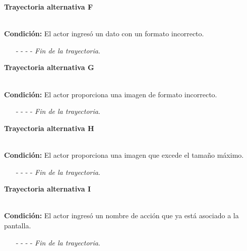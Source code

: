 \hypertarget{CU11-1-1-2:TAF}{\textbf{Trayectoria alternativa F}}\\
\noindent \textbf{Condición:} El actor ingresó un dato con un formato incorrecto.
\begin{enumerate}
	\UCpaso[\UCsist] Muestra el mensaje  señalando el campo que presenta el error en la pantalla .
	\UCpaso Regresa al paso \ref{CU11.1.2-P4} de la trayectoria principal.
	\item[- -] - - {\em {Fin de la trayectoria}}.
\end{enumerate}
\hypertarget{CU11-1-1-2:TAG}{\textbf{Trayectoria alternativa G}}\\
\noindent \textbf{Condición:} El actor proporciona una imagen de formato incorrecto.
\begin{enumerate}
	\UCpaso[\UCsist] Muestra el mensaje  señalando el campo que presenta el error en la pantalla .
	\UCpaso Regresa al paso \ref{CU11.1.2-P4} de la trayectoria principal.
	\item[- -] - - {\em {Fin de la trayectoria}}.
\end{enumerate}
\hypertarget{CU11-1-1-2:TAH}{\textbf{Trayectoria alternativa H}}\\
\noindent \textbf{Condición:} El actor proporciona una imagen que excede el tamaño máximo.
\begin{enumerate}
	\UCpaso[\UCsist] Muestra el mensaje  señalando el campo que presenta el error en la pantalla .
	\UCpaso Regresa al paso \ref{CU11.1.2-P4} de la trayectoria principal.
	\item[- -] - - {\em {Fin de la trayectoria}}.
\end{enumerate}
\hypertarget{CU11-1-1-2:TAI}{\textbf{Trayectoria alternativa I}}\\
\noindent \textbf{Condición:} El actor ingresó un nombre de acción que ya está asociado a la pantalla.
\begin{enumerate}
	\UCpaso[\UCsist] Muestra el mensaje  señalando el campo que presenta la duplicidad en la pantalla .
	\UCpaso Regresa al paso \ref{CU11.1.2-P4} de la trayectoria principal.
	\item[- -] - - {\em {Fin de la trayectoria}}.
\end{enumerate}